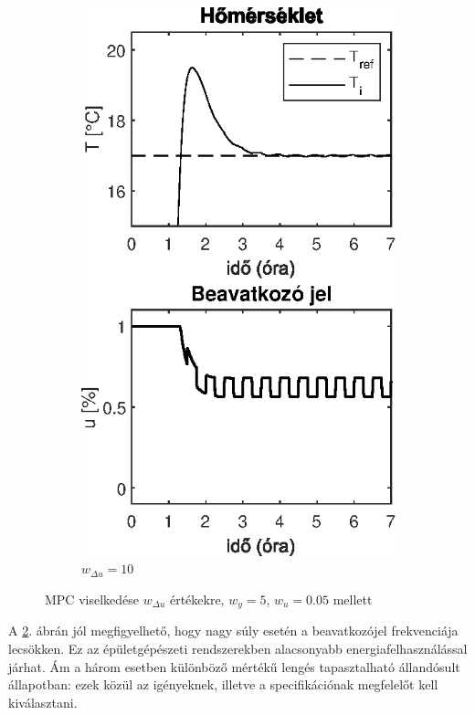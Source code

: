 \begin{figure}[H]
\begin{subfigure}[t]{0.32\textwidth}
	\includegraphics[width=\textwidth]{figures/realsys/mpc-wdu-10}
	\caption{$w_{\Delta u}=10$}
	\label{fig:mpc-wdu-10}
\end{subfigure}
\caption{MPC viselkedése  $w_{\Delta u}$ értékekre, $w_y=5$, $w_u=0.05$ mellett}
\label{fig:mpc-wdu}
\end{figure}

A \ref{fig:mpc-wdu}. ábrán jól megfigyelhető, hogy nagy súly esetén a beavatkozójel frekvenciája lecsökken. Ez az épületgépészeti rendszerekben alacsonyabb energiafelhasználással járhat. Ám a három esetben különböző mértékű lengés tapasztalható állandósult állapotban: ezek közül az igényeknek, illetve a specifikációnak megfelelőt kell kiválasztani.

